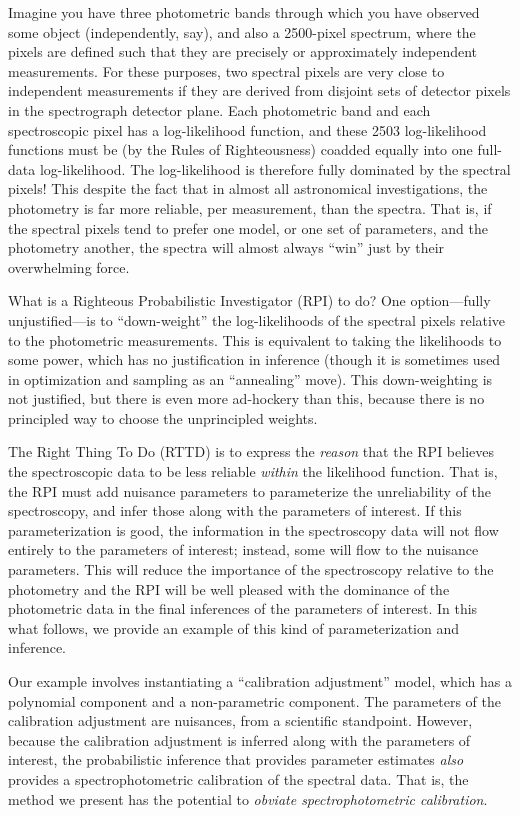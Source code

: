 \documentclass[iop,numberedappendix]{emulateapj}
\begin{document}
Imagine you have three photometric bands through which you have
observed some object (independently, say), and also a 2500-pixel
spectrum, where the pixels are defined such that they are precisely or
approximately independent measurements.
For these purposes, two spectral pixels are very close to independent
measurements if they are derived from disjoint sets of detector pixels
in the spectrograph detector plane.
Each photometric band and each spectroscopic pixel has a
log-likelihood function, and these 2503 log-likelihood functions must
be (by the Rules of Righteousness) coadded equally into one full-data
log-likelihood.
The log-likelihood is therefore fully dominated by the spectral
pixels!
This despite the fact that in almost all astronomical investigations,
the photometry is far more reliable, per measurement, than the
spectra.
That is, if the spectral pixels tend to prefer one model, or one set
of parameters, and the photometry another, the spectra will almost
always ``win'' just by their overwhelming force.

What is a Righteous Probabilistic Investigator (RPI) to do?
One option---fully unjustified---is to ``down-weight'' the
log-likelihoods of the spectral pixels relative to the photometric
measurements.
This is equivalent to taking the likelihoods to some power, which has
no justification in inference (though it is sometimes used in
optimization and sampling as an ``annealing'' move).
This down-weighting is not justified, but there is even more
ad-hockery than this, because there is no principled way to choose the
unprincipled weights.

The Right Thing To Do (RTTD) is to express the \emph{reason} that the
RPI believes the spectroscopic data to be less reliable \emph{within}
the likelihood function.
That is, the RPI must add nuisance parameters to parameterize the
unreliability of the spectroscopy, and infer those along with the
parameters of interest.
If this parameterization is good, the information in the spectroscopy
data will not flow entirely to the parameters of interest; instead,
some will flow to the nuisance parameters.
This will reduce the importance of the spectroscopy relative to the
photometry and the RPI will be well pleased with the dominance of the
photometric data in the final inferences of the parameters of
interest.
In this what follows, we provide an example of this kind of
parameterization and inference.

Our example involves instantiating a ``calibration adjustment'' model,
which has a polynomial component and a non-parametric component.
The parameters of the calibration adjustment are nuisances, from a
scientific standpoint.
However, because the calibration adjustment is inferred along with the
parameters of interest, the probabilistic inference that provides
parameter estimates \emph{also} provides a spectrophotometric
calibration of the spectral data.
That is, the method we present has the potential to \emph{obviate
spectrophotometric calibration}.
\end{document}
